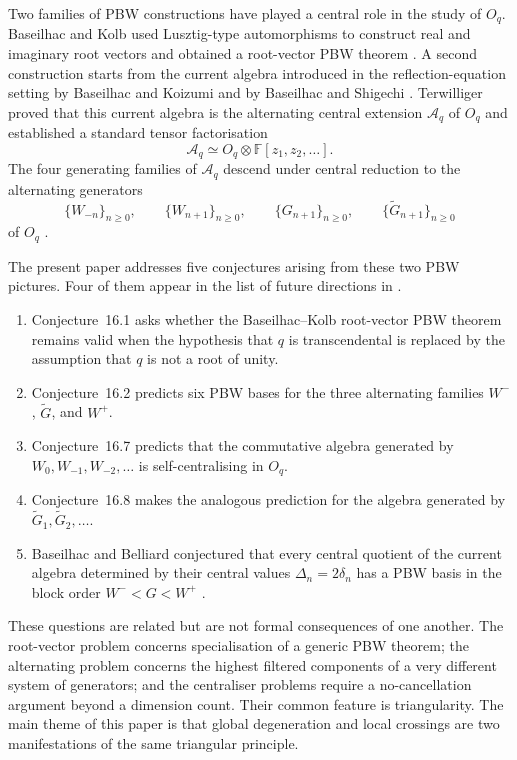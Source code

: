 \documentclass[11pt]{extarticle}
\theoremstyle{definition}
\theoremstyle{remark}
\numberwithin{equation}{section}
\newcommand{\F}{\mathbb F}
\newcommand{\Oq}{O_q}
\newcommand{\Aq}{\mathcal A_q}
\begin{document}
Two families of PBW constructions have played a central role in the study of
$\Oq$.  Baseilhac and Kolb used Lusztig-type automorphisms to construct real
and imaginary root vectors and obtained a root-vector PBW theorem
\cite{BaseilhacKolb2020}.  A second construction starts from the current
algebra introduced in the reflection-equation setting by Baseilhac and
Koizumi and by Baseilhac and Shigechi
\cite{BaseilhacKoizumi2005,BaseilhacShigechi2010}.  Terwilliger proved that
this current algebra is the alternating central extension $\Aq$ of $\Oq$
and established a standard tensor factorisation
\[
        \Aq\simeq\Oq\otimes\F[z_1,z_2,\ldots].
\]
The four generating families of $\Aq$ descend under central reduction to the
alternating generators
\[
 \{W_{-n}\}_{n\geq0},\qquad
 \{W_{n+1}\}_{n\geq0},\qquad
 \{G_{n+1}\}_{n\geq0},\qquad
 \{\widetilde G_{n+1}\}_{n\geq0}
\]
of $\Oq$ \cite{Terwilliger2021ACE,Terwilliger2022OqACE}.

The present paper addresses five conjectures arising from these two PBW
pictures.  Four of them appear in the list of future directions in
\cite[Section~16]{Terwilliger2022OqACE}.

\begin{enumerate}[label=\textup{(\roman*)},leftmargin=11mm]
\item Conjecture~16.1 asks whether the Baseilhac--Kolb root-vector PBW theorem
remains valid when the hypothesis that $q$ is transcendental is replaced by
the assumption that $q$ is not a root of unity.

\item Conjecture~16.2 predicts six PBW bases for the three alternating
families $W^-$, $\widetilde G$, and $W^+$.

\item Conjecture~16.7 predicts that the commutative algebra generated by
$W_0,W_{-1},W_{-2},\ldots$ is self-centralising in $\Oq$.

\item Conjecture~16.8 makes the analogous prediction for the algebra
generated by $\widetilde G_1,\widetilde G_2,\ldots$.

\item Baseilhac and Belliard conjectured that every central quotient of the
current algebra determined by their central values $\Delta_n=2\delta_n$
has a PBW basis in the block order $W^-<G<W^+$
\cite[Conjecture~1]{BaseilhacBelliard2017}.
\end{enumerate}

These questions are related but are not formal consequences of one another.
The root-vector problem concerns specialisation of a generic PBW theorem;
the alternating problem concerns the highest filtered components of a very
different system of generators; and the centraliser problems require a
no-cancellation argument beyond a dimension count.  Their common feature is
triangularity.  The main theme of this paper is that global degeneration and
local crossings are two manifestations of the same triangular principle.
\end{document}

